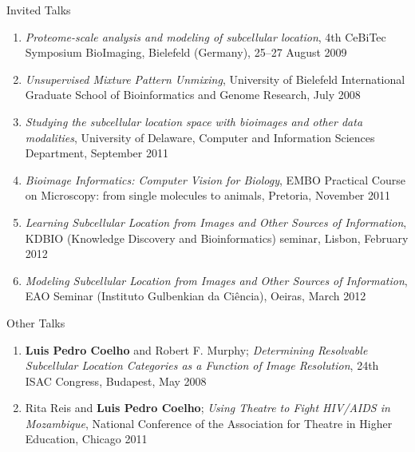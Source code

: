 \documentclass{article}
\renewcommand\subsection[1]{%
    \par\vspace{.1em}%
    {\hspace{1em}\subsubhead #1}%
    \par\vspace{.2em}%
}
\begin{document}
\subsection{Invited Talks}
\begin{enumerate}
\item \emph{Proteome-scale analysis and modeling of subcellular location}, 4th
CeBiTec Symposium BioImaging, Bielefeld (Germany), 25--27 August 2009
\item \emph{Unsupervised Mixture Pattern Unmixing}, University of Bielefeld
International Graduate School of Bioinformatics and Genome Research, July 2008
\item \emph{Studying the subcellular location space with bioimages and other
data modalities}, University of Delaware, Computer and Information Sciences
Department, September 2011
\item \emph{Bioimage Informatics: Computer Vision for Biology}, EMBO Practical
Course on Microscopy: from single molecules to animals, Pretoria, November 2011
\item \emph{Learning Subcellular Location from Images and Other Sources of
Information}, KDBIO (Knowledge Discovery and Bioinformatics) seminar, Lisbon,
February 2012
\item \emph{Modeling Subcellular Location from Images and Other Sources of
Information}, EAO Seminar (Instituto Gulbenkian da Ciência), Oeiras, March 2012

\end{enumerate}


\subsection{Other Talks}

\begin{enumerate}
\item \textbf{Luis Pedro Coelho} and Robert F. Murphy; \emph{Determining
Resolvable Subcellular Location Categories as a Function of Image Resolution},
24th ISAC Congress, Budapest, May 2008
\item Rita Reis and \textbf{Luis Pedro Coelho}; \emph{Using Theatre to Fight
HIV/AIDS in Mozambique}, National Conference of the Association for Theatre in
Higher Education, Chicago 2011
\end{enumerate}
\end{document}

